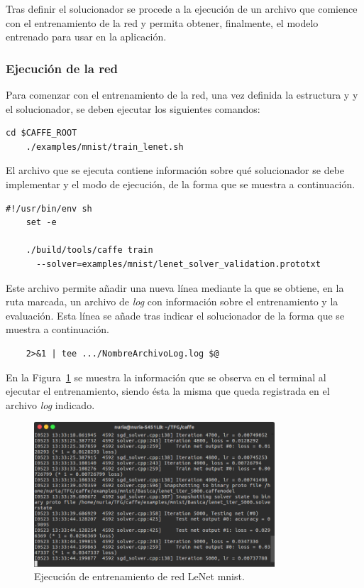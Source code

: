 	Tras definir el solucionador se procede a la ejecución de un archivo que comience con el entrenamiento de la red y permita obtener, finalmente, el modelo entrenado para usar en la aplicación.
	
\subsubsection{Ejecución de la red}
	Para comenzar con el entrenamiento de la red, una vez definida la estructura y y el solucionador, se deben ejecutar los siguientes comandos:
	\vspace{10pt}
	\begin{lstlisting}[frame=single]
	cd $CAFFE_ROOT
	./examples/mnist/train_lenet.sh	
	\end{lstlisting}
	
	El archivo que se ejecuta contiene información sobre qué solucionador se debe implementar y el modo de ejecución, de la forma que se muestra a continuación.
	\vspace{10pt}
	\begin{lstlisting}[frame=single]
	#!/usr/bin/env sh
	set -e
	
	./build/tools/caffe train 
	  --solver=examples/mnist/lenet_solver_validation.prototxt 
	\end{lstlisting}
	
	Este archivo permite añadir una nueva línea mediante la que se obtiene, en la ruta marcada, un archivo de \textit{log} con información sobre el entrenamiento y la evaluación. Esta línea se añade tras indicar el solucionador de la forma que se muestra a continuación.
	\vspace{10pt}
	\begin{lstlisting}
	2>&1 | tee .../NombreArchivoLog.log $@
	\end{lstlisting} 
	
	En la Figura~\ref{fig.entrenamiento} se muestra la información que se observa en el terminal al ejecutar el entrenamiento, siendo ésta la misma que queda registrada en el archivo \textit{log} indicado.
	
	\begin{figure}[H]
		\begin{center}
			\includegraphics[width=0.8\textwidth]{figures/RedBasica5000}
			\caption{Ejecución de entrenamiento de red LeNet \acrshort{mnist}.}
			\label{fig.entrenamiento}
		\end{center}
	\end{figure}
	
